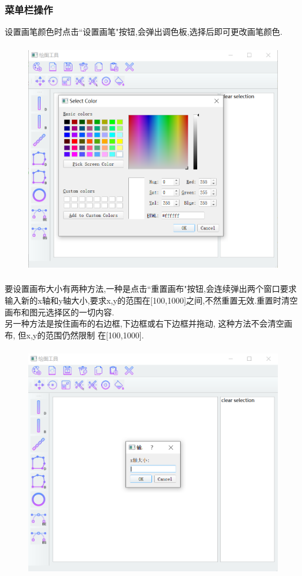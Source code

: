 \documentclass[a4paper,UTF8]{article}
\theoremstyle{definition}
\begin{document}
\subsubsection{菜单栏操作}
设置画笔颜色时点击``设置画笔"按钮,会弹出调色板,选择后即可更改画笔颜色.\\
\begin{figure}[H]
	\includegraphics[width=5in,height=4in]{color.png}
\end{figure}
要设置画布大小有两种方法,一种是点击``重置画布"按钮,会连续弹出两个窗口要求输入新的x轴和y轴大小,要求x,y的范围在[100,1000]之间,不然重置无效.重置时清空画布和图元选择区的一切内容.\\
\indent 另一种方法是按住画布的右边框,下边框或右下边框并拖动, 这种方法不会清空画布, 但x,y的范围仍然限制 在[100,1000].
\begin{figure}[H]
	\includegraphics[width=5in,height=4in]{reset.png}
\end{figure}
\end{document}
